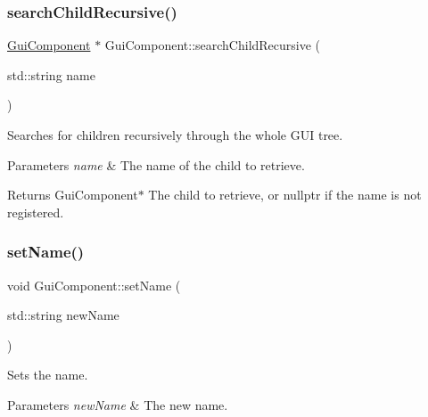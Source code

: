 \subsubsection{\texorpdfstring{search\+Child\+Recursive()}{searchChildRecursive()}}
{\footnotesize\ttfamily \mbox{\hyperlink{class_gui_component}{Gui\+Component}} $\ast$ Gui\+Component\+::search\+Child\+Recursive (\begin{DoxyParamCaption}\item[{std\+::string}]{name }\end{DoxyParamCaption})\hspace{0.3cm}{\ttfamily [virtual]}}



Searches for children recursively through the whole G\+UI tree. 


\begin{DoxyParams}{Parameters}
{\em name} & The name of the child to retrieve. \\
\hline
\end{DoxyParams}
\begin{DoxyReturn}{Returns}
Gui\+Component$\ast$ The child to retrieve, or nullptr if the name is not registered. 
\end{DoxyReturn}
\mbox{\label{class_gui_component_ae673013e55aa98c6ee267fad3e282766}} 
\subsubsection{\texorpdfstring{set\+Name()}{setName()}}
{\footnotesize\ttfamily void Gui\+Component\+::set\+Name (\begin{DoxyParamCaption}\item[{std\+::string}]{new\+Name }\end{DoxyParamCaption})}



Sets the name. 


\begin{DoxyParams}{Parameters}
{\em new\+Name} & The new name. \\
\hline
\end{DoxyParams}
\mbox{\label{class_gui_component_a526481fb2424c1ea771e78be27a091f9}} 
